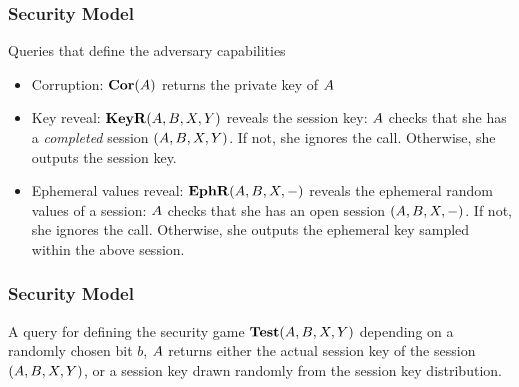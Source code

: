 \documentclass[notes,page number]{beamer}
\begin{document}
\begin{frame}
  \frametitle{Security Model}
  \begin{block}
    {Queries that define the adversary capabilities}
    \begin{itemize}
    \item Corruption: $\mathbf{Cor}({A})$ returns the private key of ${A}$
    \item Key reveal: $\mathbf{KeyR}({A},{B},X, Y)$ reveals the
      session key: ${A}$ checks that she has a {\sl completed} session
      $({A},{B}, X, Y)$. If not, she ignores the call. Otherwise, she
      outputs the session key.
\item Ephemeral values reveal: $\mathbf{EphR}({A},{B}, X, -)$
  reveals the ephemeral random values of a session: ${A}$ checks that
  she has an open session $({A},{B}, X, -)$. If not, she ignores the
  call. Otherwise, she outputs the ephemeral key sampled within the
  above session.
    \end{itemize}
  \end{block}
\end{frame}
\begin{frame}
  \frametitle{Security Model}
  \begin{block}
    {A query for defining the security game}
$\mathbf{Test}({A},{B}, X, Y)$ depending on a randomly chosen bit
$b$, ${A}$ returns either the actual session key of the session
$({A},{B}, X, Y)$, or a session key drawn randomly from the session
key distribution.
  \end{block}
\end{frame}
\end{document}

